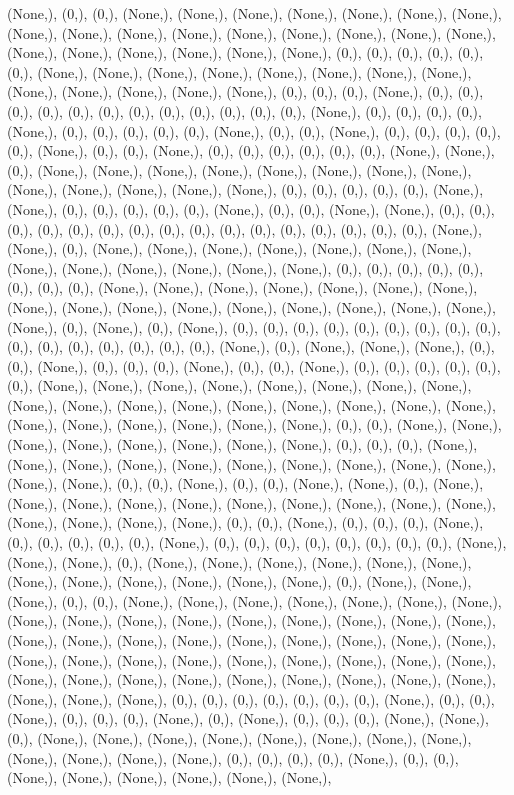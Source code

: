 \documentclass{article}
\begin{document}
(None,), (0,), (0,), (None,), (None,), (None,), (None,), (None,), (None,), (None,), (None,), (None,), (None,), (None,), (None,), (None,), (None,), (None,), (None,), (None,), (None,), (None,), (None,), (None,), (None,), (0,), (0,), (0,), (0,), (0,), (0,), (None,), (None,), (None,), (None,), (None,), (None,), (None,), (None,), (None,), (None,), (None,), (None,), (None,), (0,), (0,), (0,), (None,), (0,), (0,), (0,), (0,), (0,), (0,), (0,), (0,), (0,), (0,), (0,), (0,), (None,), (0,), (0,), (0,), (0,), (None,), (0,), (0,), (0,), (0,), (0,), (None,), (0,), (0,), (None,), (0,), (0,), (0,), (0,), (0,), (None,), (0,), (0,), (None,), (0,), (0,), (0,), (0,), (0,), (0,), (None,), (None,), (0,), (None,), (None,), (None,), (None,), (None,), (None,), (None,), (None,), (None,), (None,), (None,), (None,), (None,), (0,), (0,), (0,), (0,), (0,), (None,), (None,), (0,), (0,), (0,), (0,), (0,), (None,), (0,), (0,), (None,), (None,), (0,), (0,), (0,), (0,), (0,), (0,), (0,), (0,), (0,), (0,), (0,), (0,), (0,), (0,), (0,), (0,), (None,), (None,), (0,), (None,), (None,), (None,), (None,), (None,), (None,), (None,), (None,), (None,), (None,), (None,), (None,), (None,), (0,), (0,), (0,), (0,), (0,), (0,), (0,), (0,), (None,), (None,), (None,), (None,), (None,), (None,), (None,), (None,), (None,), (None,), (None,), (None,), (None,), (None,), (None,), (None,), (None,), (0,), (None,), (0,), (None,), (0,), (0,), (0,), (0,), (0,), (0,), (0,), (0,), (0,), (0,), (0,), (0,), (0,), (0,), (0,), (0,), (None,), (0,), (None,), (None,), (None,), (0,), (0,), (None,), (0,), (0,), (0,), (None,), (0,), (0,), (None,), (0,), (0,), (0,), (0,), (0,), (0,), (None,), (None,), (None,), (None,), (None,), (None,), (None,), (None,), (None,), (None,), (None,), (None,), (None,), (None,), (None,), (None,), (None,), (None,), (None,), (None,), (None,), (None,), (None,), (0,), (0,), (None,), (None,), (None,), (None,), (None,), (None,), (None,), (None,), (0,), (0,), (0,), (None,), (None,), (None,), (None,), (None,), (None,), (None,), (None,), (None,), (None,), (None,), (None,), (0,), (0,), (None,), (0,), (0,), (None,), (None,), (0,), (None,), (None,), (None,), (None,), (None,), (None,), (None,), (None,), (None,), (None,), (None,), (None,), (None,), (None,), (0,), (0,), (None,), (0,), (0,), (0,), (None,), (0,), (0,), (0,), (0,), (0,), (None,), (0,), (0,), (0,), (0,), (0,), (0,), (0,), (0,), (None,), (None,), (None,), (0,), (None,), (None,), (None,), (None,), (None,), (None,), (None,), (None,), (None,), (None,), (None,), (None,), (0,), (None,), (None,), (None,), (0,), (0,), (None,), (None,), (None,), (None,), (None,), (None,), (None,), (None,), (None,), (None,), (None,), (None,), (None,), (None,), (None,), (None,), (None,), (None,), (None,), (None,), (None,), (None,), (None,), (None,), (None,), (None,), (None,), (None,), (None,), (None,), (None,), (None,), (None,), (None,), (None,), (None,), (None,), (None,), (None,), (None,), (None,), (None,), (None,), (None,), (None,), (None,), (0,), (0,), (0,), (0,), (0,), (0,), (0,), (None,), (0,), (0,), (None,), (0,), (0,), (0,), (None,), (0,), (None,), (0,), (0,), (0,), (None,), (None,), (0,), (None,), (None,), (None,), (None,), (None,), (None,), (None,), (None,), (None,), (None,), (None,), (None,), (0,), (0,), (0,), (0,), (None,), (0,), (0,), (None,), (None,), (None,), (None,), (None,), (None,), 
\end{document}
